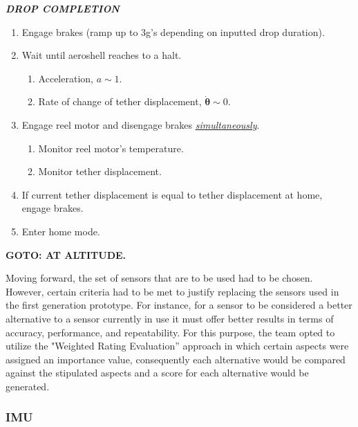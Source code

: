 \vspace{5mm}

\noindent\textbf{\textit{DROP COMPLETION}}
\begin{enumerate}
    \item Engage brakes (ramp up to 3g’s depending on inputted drop duration).
    \item Wait until aeroshell reaches to a halt.
    \begin{enumerate}[noitemsep, nolistsep, label*=\arabic*.]
        \item Acceleration, $a\sim1$.
        \item Rate of change of tether displacement, $\dot{\boldsymbol{\theta}}\sim0$.
    \end{enumerate}
    
    \item Engage reel motor and disengage brakes \textit{\underline{simultaneously}}.
    \begin{enumerate}[noitemsep, nolistsep, label*=\arabic*.]
        \item Monitor reel motor’s temperature.
        \item Monitor tether displacement.
    \end{enumerate}
    
    \item If current tether displacement is equal to tether displacement at home, engage brakes.
    \item Enter home mode.
\end{enumerate}
\indent\indent\textbf{GOTO: AT ALTITUDE.}

\vspace{5mm}

Moving forward, the set of sensors that are to be used had to be chosen. However, certain criteria had to be met to justify replacing the sensors used in the first generation prototype. For instance, for a sensor to be considered a better alternative to a sensor currently in use it must offer better results in terms of accuracy, performance, and repeatability. For this purpose, the team opted to utilize the "Weighted Rating Evaluation” approach in which certain aspects were assigned an importance value, consequently each alternative would be compared against the stipulated aspects and a score for each alternative would be generated.


\subsubsection{IMU}


